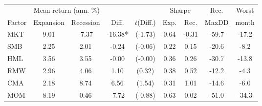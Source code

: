 \begin{tabular}{lcccccccc}
\toprule
 & \multicolumn{2}{c}{Mean return (ann. \%)} & & & \multicolumn{2}{c}{Sharpe} & Rec. & Worst \\
\cmidrule(lr){2-3}\cmidrule(lr){6-7}
Factor & Expansion & Recession & Diff. & $t$(Diff.) & Exp. & Rec. & MaxDD & month \\
\midrule
MKT & 9.01 & -7.37 & -16.38* & (-1.73) & 0.64 & -0.31 & -59.7 & -17.2 \\
SMB & 2.25 & 2.01 & -0.24 & (-0.06) & 0.22 & 0.15 & -20.6 & -8.2 \\
HML & 3.56 & 3.55 & -0.00 & (-0.00) & 0.36 & 0.26 & -30.7 & -13.8 \\
RMW & 2.96 & 4.06 & 1.10 & (0.32) & 0.38 & 0.52 & -12.2 & -4.3 \\
CMA & 2.18 & 8.74 & 6.56 & (1.54) & 0.31 & 1.01 & -14.6 & -6.0 \\
MOM & 8.19 & 0.46 & -7.72 & (-0.88) & 0.63 & 0.02 & -51.0 & -34.3 \\
\bottomrule
\end{tabular}
